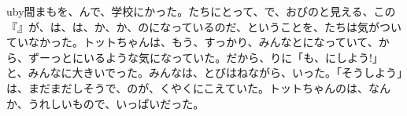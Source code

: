uby{間}{ま}もを、んで、学校にかった。たちにとって、で、おびのと見える、この『』が、は、は、か、か、のになっているのだ、ということを、たちは気がついていなかった。トットちゃんは、もう、すっかり、みんなとになっていて、から、ずーっとにいるような気になっていた。だから、りに「も、にしよう!」と、みんなに大きいでった。みんなは、とびはねながら、いった。「そうしよう」は、まだまだしそうで、のが、くやくにこえていた。トットちゃんのは、なんか、うれしいもので、いっぱいだった。


